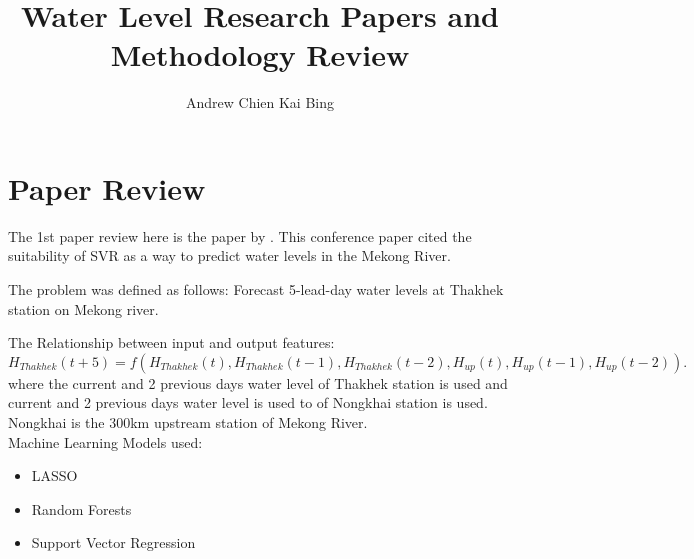 \documentclass[]{article}
\title{Water Level Research Papers and Methodology Review}
\author{Andrew Chien Kai Bing}
\begin{document}
\maketitle

\begin{abstract}

\end{abstract}

\section{Paper Review}
	The 1st paper review here is the paper by \cite{Nguyen2015Oct}. This conference paper cited the suitability of SVR as a way to predict water levels in the Mekong River.
	
	The problem was defined as follows:
	Forecast 5-lead-day water levels at Thakhek station on Mekong river.
	
	The Relationship between input and output features:\\

		\(H_{Thakhek}(t + 5) = f(H_{Thakhek}(t),H_{Thakhek}(t − 1),H_{Thakhek}(t − 2),H_{up}(t),H_{up}(t − 1),H_{up}(t − 2)).\)\\	
	
	where the current and 2 previous days water level of Thakhek station is used and current and 2 previous days water level is used to of Nongkhai station is used. Nongkhai is the 300km upstream station of Mekong River.\\
	
	Machine Learning Models used:
	\begin{itemize}
		\item LASSO
		\item Random Forests
		\item Support Vector Regression
	\end{itemize}


	
	
\end{document}
